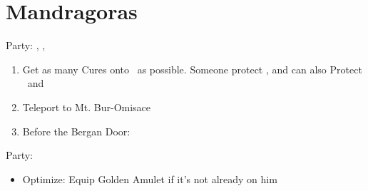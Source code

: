 \chapter{Mandragoras}
\begin{menu}
Party: \basch, \balthier, \fran
\end{menu}
\begin{enumerate}
	\item Get as many Cures onto \basch\ as possible. Someone protect \basch, and can also Protect \fran\ and \balthier
	\item Teleport to Mt. Bur-Omisace
	\item Before the Bergan Door: 
\end{enumerate}
\begin{menu}
Party: \vaan
\end{menu}
\begin{equip}
\begin{itemize}
\item Optimize: \vaan
\vaanf Equip Golden Amulet if it's not already on him
\end{itemize}
\end{equip}
